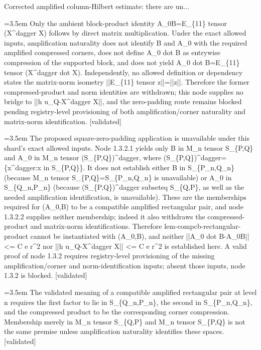 \documentclass{article}
\newcommand{\step}[1]{\par\noindent\hangindent=3.5em\hangafter=1%
  \makebox[3.5em][l]{\textbf{#1.}}}
\newcommand{\steptag}[1]{\hfill{\small\textsf{[#1]}}}
\begin{document}
\begin{proofbox}{Corrected amplified column-Hilbert estimate: there are un...}
\step{1.3.2.2.1} Only the ambient block-product identity A\_0B=E\_\{11\} tensor (X\textasciicircum{}dagger X) follows by direct matrix multiplication. Under the exact allowed inputs, amplification naturality does not identify B and A\_0 with the required amplified compressed corners, does not define A\_0 dot B as entrywise compression of the supported block, and does not yield A\_0 dot B=E\_\{11\} tensor (X\textasciicircum{}dagger dot X). Independently, no allowed definition or dependency states the matrix-norm isometry ||E\_\{11\} tensor z||=||z||. Therefore the former compressed-product and norm identities are withdrawn; this node supplies no bridge to ||h u\_Q-X\textasciicircum{}dagger X||, and the zero-padding route remains blocked pending registry-level provisioning of both amplification/corner naturality and matrix-norm identification. \steptag{validated} \\[4pt]
\step{1.3.2.3} The proposed square-zero-padding application is unavailable under this shard's exact allowed inputs. Node 1.3.2.1 yields only B in M\_n tensor S\_\{P,Q\} and A\_0 in M\_n tensor (S\_\{P,Q\})\textasciicircum{}dagger, where (S\_\{P,Q\})\textasciicircum{}dagger=\{x\textasciicircum{}dagger:x in S\_\{P,Q\}\}. It does not establish either B in S\_\{P\_n,Q\_n\} (because M\_n tensor S\_\{P,Q\}=S\_\{P\_n,Q\_n\} is unavailable) or A\_0 in S\_\{Q\_n,P\_n\} (because (S\_\{P,Q\})\textasciicircum{}dagger subseteq S\_\{Q,P\}, as well as the needed amplification identification, is unavailable). These are the memberships required for (A\_0,B) to be a compatible amplified rectangular pair, and node 1.3.2.2 supplies neither membership; indeed it also withdraws the compressed-product and matrix-norm identifications. Therefore lem-compcb-rectangular-product cannot be instantiated with (A\_0,B), and neither ||A\_0 dot B-A\_0B|| <= C e r\textasciicircum{}2 nor ||h u\_Q-X\textasciicircum{}dagger X|| <= C e r\textasciicircum{}2 is established here. A valid proof of node 1.3.2 requires registry-level provisioning of the missing amplification/corner and norm-identification inputs; absent those inputs, node 1.3.2 is blocked. \steptag{validated} \\[6pt]
\step{1.3.2.3.1} The validated meaning of a compatible amplified rectangular pair at level n requires the first factor to lie in S\_\{Q\_n,P\_n\}, the second in S\_\{P\_n,Q\_n\}, and the compressed product to be the corresponding corner compression. Membership merely in M\_n tensor S\_\{Q,P\} and M\_n tensor S\_\{P,Q\} is not the same premise unless amplification naturality identifies these spaces. \steptag{validated} \\[4pt]

\end{proofbox}
\end{document}
